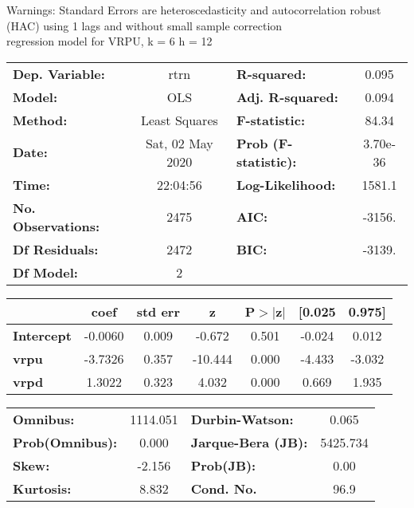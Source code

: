 Warnings: \newline
 [1] Standard Errors are heteroscedasticity and autocorrelation robust (HAC) using 1 lags and without small sample correction\\ 

regression model for VRPU, k = 6 h = 12\begin{center}
\begin{tabular}{lclc}
\toprule
\textbf{Dep. Variable:}    &       rtrn       & \textbf{  R-squared:         } &     0.095   \\
\textbf{Model:}            &       OLS        & \textbf{  Adj. R-squared:    } &     0.094   \\
\textbf{Method:}           &  Least Squares   & \textbf{  F-statistic:       } &     84.34   \\
\textbf{Date:}             & Sat, 02 May 2020 & \textbf{  Prob (F-statistic):} &  3.70e-36   \\
\textbf{Time:}             &     22:04:56     & \textbf{  Log-Likelihood:    } &    1581.1   \\
\textbf{No. Observations:} &        2475      & \textbf{  AIC:               } &    -3156.   \\
\textbf{Df Residuals:}     &        2472      & \textbf{  BIC:               } &    -3139.   \\
\textbf{Df Model:}         &           2      & \textbf{                     } &             \\
\bottomrule
\end{tabular}
\begin{tabular}{lcccccc}
                   & \textbf{coef} & \textbf{std err} & \textbf{z} & \textbf{P$> |$z$|$} & \textbf{[0.025} & \textbf{0.975]}  \\
\midrule
\textbf{Intercept} &      -0.0060  &        0.009     &    -0.672  &         0.501        &       -0.024    &        0.012     \\
\textbf{vrpu}      &      -3.7326  &        0.357     &   -10.444  &         0.000        &       -4.433    &       -3.032     \\
\textbf{vrpd}      &       1.3022  &        0.323     &     4.032  &         0.000        &        0.669    &        1.935     \\
\bottomrule
\end{tabular}
\begin{tabular}{lclc}
\textbf{Omnibus:}       & 1114.051 & \textbf{  Durbin-Watson:     } &    0.065  \\
\textbf{Prob(Omnibus):} &   0.000  & \textbf{  Jarque-Bera (JB):  } & 5425.734  \\
\textbf{Skew:}          &  -2.156  & \textbf{  Prob(JB):          } &     0.00  \\
\textbf{Kurtosis:}      &   8.832  & \textbf{  Cond. No.          } &     96.9  \\
\bottomrule
\end{tabular}
\end{center}


